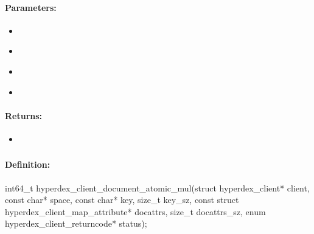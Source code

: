 \paragraph{Parameters:}
\begin{itemize}[noitemsep]
\item {}\\

\item {}\\

\item {}\\

\item {}\\

\end{itemize}

\paragraph{Returns:}
\begin{itemize}[noitemsep]
\item {}\\

\end{itemize}

\pagebreak
\subsubsection{}
\label{api:c:document_atomic_mul}


\paragraph{Definition:}
\begin{ccode}
int64_t hyperdex_client_document_atomic_mul(struct hyperdex_client* client,
        const char* space,
        const char* key, size_t key_sz,
        const struct hyperdex_client_map_attribute* docattrs, size_t docattrs_sz,
        enum hyperdex_client_returncode* status);
\end{ccode}

